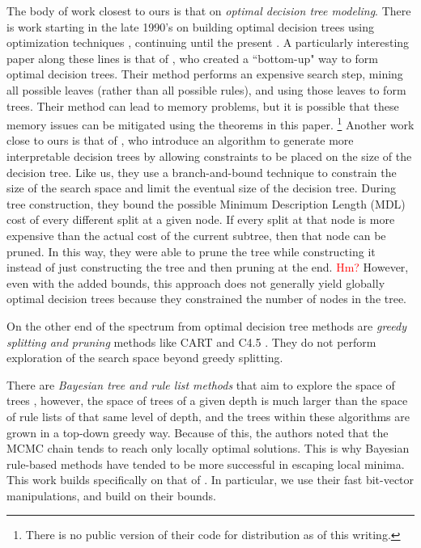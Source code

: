 The body of work closest to ours is that on \textit{optimal decision tree modeling}. There is work starting in the late 1990's on building optimal decision trees using optimization techniques \citep[e.g.,][]{Bennett96optimaldecision,Auer95theoryand,dobkininduction}, continuing until the present \citep{e.g., farhangfar2008fast}. 
A particularly interesting paper along these lines is that of \citet{NijssenFromont2010}, who created a ``bottom-up" way to form optimal decision trees. Their method performs an expensive search step, mining all possible leaves (rather than all possible rules), and using those leaves to form trees. Their method can lead to memory problems, but it is possible that these memory issues can be mitigated using the theorems in this paper. \footnote{There is no public version of their code for distribution as of this writing.} Another work close to ours is that of \citet{garofalakis:2000-kdd,garofalakis:2000-sigkdd,garofalakis:2003}, who introduce an algorithm to generate more interpretable decision trees by allowing constraints to be placed on the size of the decision tree. Like us, they use a branch-and-bound technique to constrain the size of the search space and limit the eventual size of the decision tree. During tree construction, they bound the possible Minimum Description Length (MDL) cost of every different split at a given node. If every split at that node is more expensive than the actual cost of the current subtree, then that node can be pruned. In this way, they were able to prune the tree while constructing it instead of just constructing the tree and then pruning at the end. \textcolor{red}{Hm?} However, even with the added bounds, this approach does not generally yield globally optimal decision trees because they constrained the number of nodes in the tree.

On the other end of the spectrum from optimal decision tree methods are \textit{greedy splitting and pruning} methods like CART \cite{} and C4.5 \cite{}. They do not perform exploration of the search space beyond greedy splitting.

There are \textit{Bayesian tree and rule list methods} that aim to explore the space of trees \cite{Dension:1998hl,Chipman:2002hc,Chipman10}, however, the space of trees of a given depth is much larger than the space of rule lists of that same level of depth, and the trees within these algorithms are grown in a top-down greedy way. Because of this, the authors noted that the MCMC chain tends to reach only locally optimal solutions. This is why Bayesian rule-based methods \citep{LethamRuMcMa15,YangRuSe16} have tended to be more successful in escaping local minima. This work builds specifically on that of \citet{YangRuSe16}. In particular, we use their fast bit-vector manipulations, and build on their bounds. 

